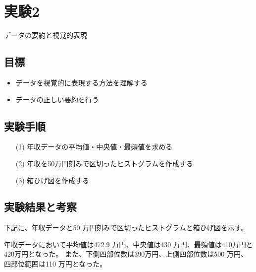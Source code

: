 \documentclass[12pt]{jarticle}
\begin{document}
\section{実験2}
データの要約と視覚的表現

\subsection{目標}
\begin{itemize}
    \item データを視覚的に表現する方法を理解する
    \item データの正しい要約を行う
\end{itemize}

\subsection{実験手順}
\begin{itemize}
    \item[(1)] 年収データの平均値・中央値・最頻値を求める
    \item[(2)] 年収を50万円刻みで区切ったヒストグラムを作成する
    \item[(3)] 箱ひげ図を作成する
\end{itemize}

\subsection{実験結果と考察}
下記に、年収データと50 万円刻みで区切ったヒストグラムと箱ひげ図を示す。

年収データにおいて平均値は472.9 万円、中央値は430 万円、最頻値は410万円と420万円となった。
また、下側四部位数は390万円、上側四部位数は500 万円、四部位範囲は110 万円となった。
\end{document}
